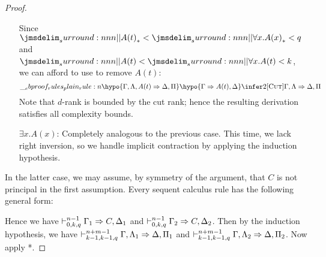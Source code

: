 \documentclass[a4paper]{article}
\begin{document}
\begin{proof}
\begin{itemize}
    Since $\qRank{A(t)} < \qRank{\forall x.A(x)} < q$ and $\cRank{A(t)} < \cRank{\forall x.A(t)} < k$, we can afford to use \rCut{} to remove $A(t)$:
    \[
      \ebrule{
        \hypo{\Gamma,\Lambda,A(t) \Rightarrow \Delta,\Pi}
        \hypo{\Gamma \Rightarrow A(t),\Delta}
        \infer2[\rCut]{\Gamma,\Lambda \Rightarrow \Delta,\Pi}
      }
    \]
    Note that $d$-rank is bounded by the cut rank; hence the resulting derivation satisfies all complexity bounds.
  \item[$\exists x.A(x)$:] Completely analogous to the previous case.
    This time, we lack right inversion, so we handle implicit contraction by applying the induction hypothesis.
  \end{itemize}
  In the latter case, we may assume, by symmetry of the argument, that $C$ is not principal in the first assumption.
  Every sequent calculus rule has the following general form:
  \begin{mathpar}
  \end{mathpar}
  Hence we have $\dVdash{n-1}{0}{k}{q} \Gamma_1 \Rightarrow C,\Delta_1$ and $\dVdash{n-1}{0}{k}{q} \Gamma_2 \Rightarrow C,\Delta_2$.
  Then by the induction hypothesis, we have $\dVdash{n+m-1}{k-1}{k-1}{q} \Gamma,\Lambda_1 \Rightarrow \Delta,\Pi_1$ and $\dVdash{n+m-1}{k-1}{k-1}{q} \Gamma,\Lambda_2 \Rightarrow \Delta,\Pi_2$.
  Now apply *.
\end{proof}
\end{document}

